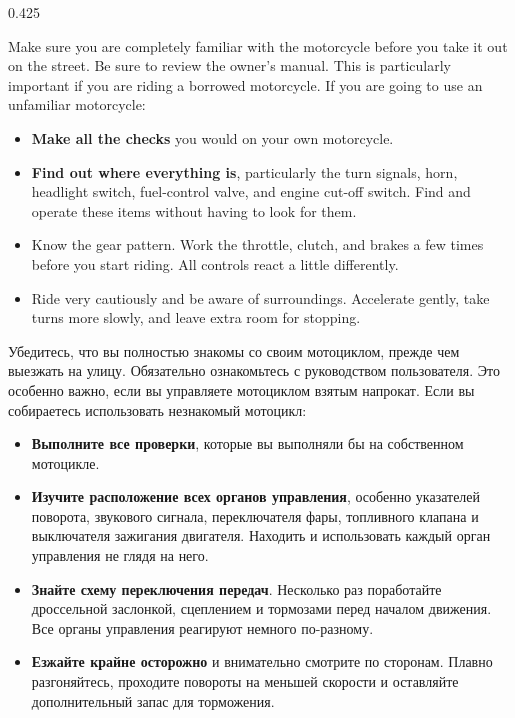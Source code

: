 \begin{langblock}{0.425}
\begin{eng}	
	Make sure you are completely familiar with the motorcycle before you take it out on the street. Be sure to review the owner's manual. This is particularly important if you are riding a borrowed motorcycle. If you are going to use an unfamiliar motorcycle:
	\begin{itemize}
		\item \textbf{Make all the checks} you would on your own motorcycle.
		\item \textbf{Find out where everything is}, particularly the turn signals, horn, headlight switch, fuel-control valve, and engine cut-off switch. Find and operate these items without having to look for them.
		\item Know the gear pattern. Work the throttle, clutch, and brakes a few times before you start riding. All controls react a little differently.
		\item Ride very cautiously and be aware of surroundings. Accelerate gently, take turns more slowly, and leave extra room for stopping.
	\end{itemize}
\end{eng}
\begin{rus}
		Убедитесь, что вы полностью знакомы со своим мотоциклом, прежде чем выезжать на улицу. Обязательно ознакомьтесь с руководством пользователя. Это особенно важно, если вы управляете мотоциклом взятым напрокат. Если вы собираетесь использовать незнакомый мотоцикл:
		\begin{itemize}
			\item \textbf{Выполните все проверки}, которые вы выполняли бы на собственном мотоцикле.
			\item \textbf{Изучите расположение всех органов управления}, особенно указателей поворота, звукового сигнала, переключателя фары, топливного клапана и выключателя зажигания двигателя. Находить и использовать каждый орган управления не глядя на него.
			\item \textbf{Знайте схему переключения передач}. Несколько раз поработайте дроссельной заслонкой, сцеплением и тормозами перед началом движения. Все органы управления реагируют немного по-разному.
			\item \textbf{Езжайте крайне осторожно} и внимательно смотрите по сторонам. Плавно разгоняйтесь, проходите повороты на меньшей скорости и оставляйте дополнительный запас для торможения.
		\end{itemize}
\end{rus}
\end{langblock}

